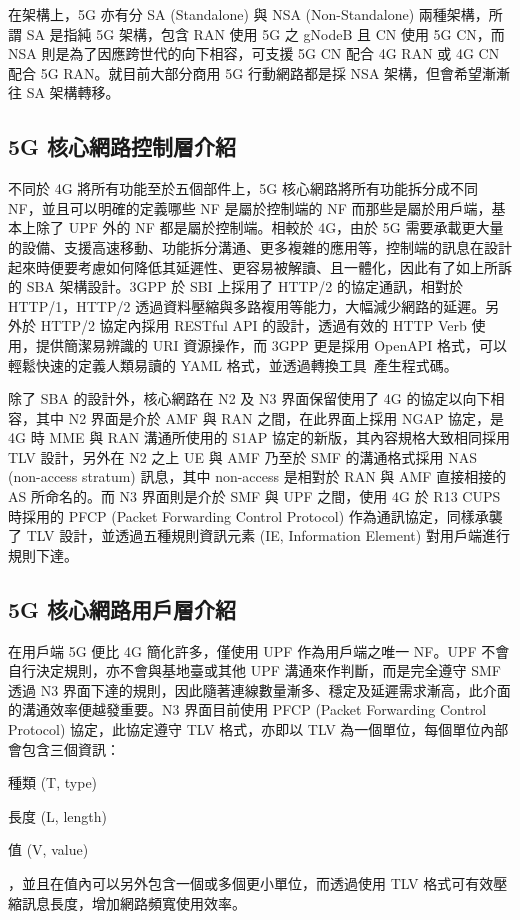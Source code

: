 在架構上，5G 亦有分 SA (Standalone) 與 NSA (Non-Standalone) 兩種架構，所謂 SA 是指純 5G 架構，包含 RAN 使用 5G 之 gNodeB 且 CN 使用 5G CN，而 NSA 則是為了因應跨世代的向下相容，可支援 5G CN 配合 4G RAN 或 4G CN 配合 5G RAN。就目前大部分商用 5G 行動網路都是採 NSA 架構，但會希望漸漸往 SA 架構轉移。

\subsection{5G 核心網路控制層介紹}
\label{subsec:5g_cp_intro}

不同於 4G 將所有功能至於五個部件上，5G 核心網路將所有功能拆分成不同 NF，並且可以明確的定義哪些 NF 是屬於控制端的 NF 而那些是屬於用戶端，基本上除了 UPF 外的 NF 都是屬於控制端。相較於 4G，由於 5G 需要承載更大量的設備、支援高速移動、功能拆分溝通、更多複雜的應用等，控制端的訊息在設計起來時便要考慮如何降低其延遲性、更容易被解讀、且一體化，因此有了如上所訴的 SBA 架構設計。3GPP 於 SBI 上採用了 HTTP/2 的協定通訊，相對於 HTTP/1，HTTP/2 透過資料壓縮與多路複用等能力，大幅減少網路的延遲。另外於 HTTP/2 協定內採用 RESTful API 的設計，透過有效的 HTTP Verb 使用，提供簡潔易辨識的 URI 資源操作，而 3GPP 更是採用 OpenAPI 格式，可以輕鬆快速的定義人類易讀的 YAML 格式，並透過轉換工具~\cite{openapi.generator}產生程式碼。

除了 SBA 的設計外，核心網路在 N2 及 N3 界面保留使用了 4G 的協定以向下相容，其中 N2 界面是介於 AMF 與 RAN 之間，在此界面上採用 NGAP 協定，是 4G 時 MME 與 RAN 溝通所使用的 S1AP 協定的新版，其內容規格大致相同採用 TLV 設計，另外在 N2 之上 UE 與 AMF 乃至於 SMF 的溝通格式採用 NAS (non-access stratum) 訊息，其中 non-access 是相對於 RAN 與 AMF 直接相接的 AS 所命名的。而 N3 界面則是介於 SMF 與 UPF 之間，使用 4G 於 R13 CUPS 時採用的 PFCP (Packet Forwarding Control Protocol) 作為通訊協定，同樣承襲了 TLV 設計，並透過五種規則資訊元素 (IE, Information Element) 對用戶端進行規則下達。

\subsection{5G 核心網路用戶層介紹}
\label{subsec:5g_up_intro}

在用戶端 5G 便比 4G 簡化許多，僅使用 UPF 作為用戶端之唯一 NF。UPF 不會自行決定規則，亦不會與基地臺或其他 UPF 溝通來作判斷，而是完全遵守 SMF 透過 N3 界面下達的規則，因此隨著連線數量漸多、穩定及延遲需求漸高，此介面的溝通效率便越發重要。N3 界面目前使用 PFCP (Packet Forwarding Control Protocol) 協定，此協定遵守 TLV 格式，亦即以 TLV 為一個單位，每個單位內部會包含三個資訊：
\begin{enumerate*}
\item 種類 (T, type)
\item 長度 (L, length)
\item 值 (V, value)
\end{enumerate*}
，並且在值內可以另外包含一個或多個更小單位，而透過使用 TLV 格式可有效壓縮訊息長度，增加網路頻寬使用效率。

